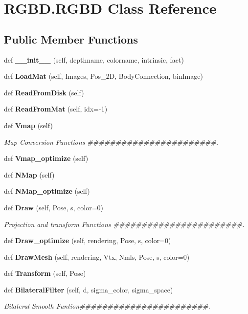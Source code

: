 \section{R\+G\+B\+D.\+R\+G\+BD Class Reference}
\label{class_r_g_b_d_1_1_r_g_b_d}
\subsection*{Public Member Functions}
\begin{DoxyCompactItemize}
\item 
def \textbf{ \+\_\+\+\_\+init\+\_\+\+\_\+} (self, depthname, colorname, intrinsic, fact)
\item 
def \textbf{ Load\+Mat} (self, Images, Pos\+\_\+2D, Body\+Connection, bin\+Image)
\item 
def \textbf{ Read\+From\+Disk} (self)
\item 
def \textbf{ Read\+From\+Mat} (self, idx=-\/1)
\item 
def \textbf{ Vmap} (self)
\begin{DoxyCompactList}\small\item\em Map Conversion Functions \#\#\#\#\#\#\#\#\#\#\#\#\#\#\#\#\#\#\#\#\#\#\#. \end{DoxyCompactList}\item 
def \textbf{ Vmap\+\_\+optimize} (self)
\item 
def \textbf{ N\+Map} (self)
\item 
def \textbf{ N\+Map\+\_\+optimize} (self)
\item 
def \textbf{ Draw} (self, Pose, s, color=0)
\begin{DoxyCompactList}\small\item\em Projection and transform Functions \#\#\#\#\#\#\#\#\#\#\#\#\#\#\#\#\#\#\#\#\#\#\#. \end{DoxyCompactList}\item 
def \textbf{ Draw\+\_\+optimize} (self, rendering, Pose, s, color=0)
\item 
def \textbf{ Draw\+Mesh} (self, rendering, Vtx, Nmls, Pose, s, color=0)
\item 
def \textbf{ Transform} (self, Pose)
\item 
def \textbf{ Bilateral\+Filter} (self, d, sigma\+\_\+color, sigma\+\_\+space)
\begin{DoxyCompactList}\small\item\em Bilateral Smooth Funtion\#\#\#\#\#\#\#\#\#\#\#\#\#\#\#\#\#\#\#\#\#\#\#. \end{DoxyCompactList}\item 

\end{DoxyCompactItemize}
